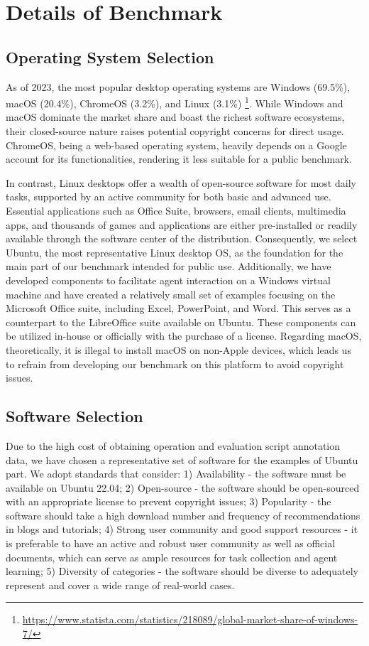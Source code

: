 \section{Details of \ours Benchmark}
\subsection{Operating System Selection}
\label{app:os_selection}
As of 2023, the most popular desktop operating systems are Windows (69.5\%), macOS (20.4\%), ChromeOS (3.2\%), and Linux (3.1\%) \footnote{\url{https://www.statista.com/statistics/218089/global-market-share-of-windows-7/}}. 
While Windows and macOS dominate the market share and boast the richest software ecosystems, their closed-source nature raises potential copyright concerns for direct usage. 
ChromeOS, being a web-based operating system, heavily depends on a Google account for its functionalities, rendering it less suitable for a public benchmark. 

In contrast, Linux desktops offer a wealth of open-source software for most daily tasks, supported by an active community for both basic and advanced use. 
Essential applications such as Office Suite, browsers, email clients, multimedia apps, and thousands of games and applications are either pre-installed or readily available through the software center of the distribution. 
Consequently, we select Ubuntu, the most representative Linux desktop OS, as the foundation for the main part of our benchmark intended for public use.
Additionally, we have developed components to facilitate agent interaction on a Windows virtual machine and have created a relatively small set of examples focusing on the Microsoft Office suite, including Excel, PowerPoint, and Word. 
This serves as a counterpart to the LibreOffice suite available on Ubuntu. 
These components can be utilized in-house or officially with the purchase of a license.
Regarding macOS, theoretically, it is illegal to install macOS on non-Apple devices, which leads us to refrain from developing our benchmark on this platform to avoid copyright issues.

\subsection{Software Selection}
\label{app:software_selection}
Due to the high cost of obtaining operation and evaluation script annotation data, we have chosen a representative set of software for the examples of Ubuntu part.
We adopt standards that consider: 
1) Availability - the software must be available on Ubuntu 22.04; 
2) Open-source - the software should be open-sourced with an appropriate license to prevent copyright issues; 
3) Popularity - the software should take a high download number and frequency of recommendations in blogs and tutorials; 
4) Strong user community and good support resources - it is preferable to have an active and robust user community as well as official documents, which can serve as ample resources for task collection and agent learning; 
5) Diversity of categories - the software should be diverse to adequately represent and cover a wide range of real-world cases. 

